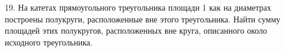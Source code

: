 19. На катетах прямоугольного треугольника площади 1 как на диаметрах построены полукруги, расположенные вне этого треугольника. Найти сумму площадей этих полукругов, расположенных вне круга, описанного около исходного треугольника.\\
